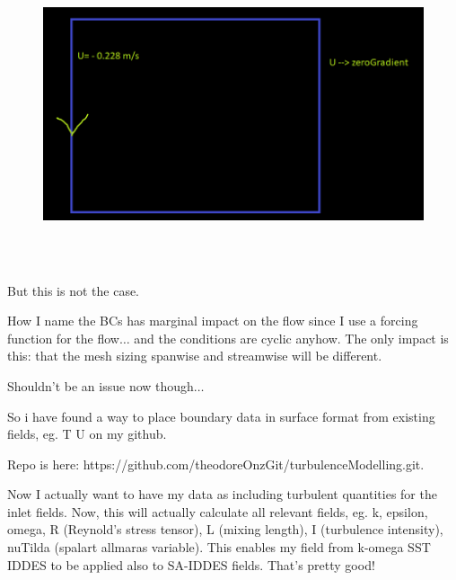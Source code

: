 \documentclass[12pt]{article}
\renewcommand{\_}{\kern-1.5pt\textunderscore\kern-1.5pt}
\begin{document}
\begin{figure}[H]
	\begin{Center}
		\includegraphics[width=6.26in,height=3.51in]{./media/image29.png}
	\end{Center}
\end{figure}



 But this is not the case. \par

How I name the BCs has marginal impact on the flow since I use a forcing function for the flow$ \ldots $  and the conditions are cyclic anyhow. The only impact is this: that the mesh sizing spanwise and streamwise will be different.\par

Shouldn’t be an issue now though$ \ldots $ \par


\vspace{\baselineskip}

\par


So i have found a way to place boundary data in surface format from
existing fields, eg. T U on my github. 

Repo is here: https://github.com/theodoreOnzGit/turbulenceModelling.git.

Now I actually want to have my data as including turbulent quantities
for the inlet fields. Now, this will actually calculate all relevant
fields, eg. k, epsilon, omega, R (Reynold's stress tensor), L (mixing
length), I (turbulence intensity), nuTilda (spalart allmaras variable).
This enables my field from k-omega SST IDDES to be applied also to
SA-IDDES fields. That's pretty good!
\end{document}
